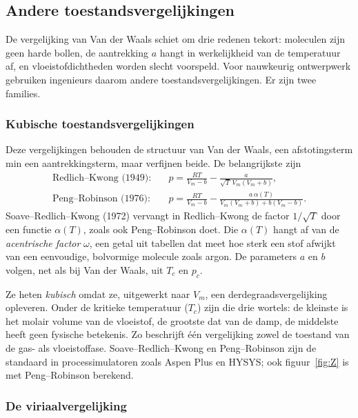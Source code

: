 \subsection{Andere toestandsvergelijkingen}
\label{sec:andere-toestandsvgl}

De vergelijking van Van der Waals schiet om drie redenen tekort: moleculen zijn geen harde bollen, de aantrekking $a$ hangt in werkelijkheid van de temperatuur af, en vloeistofdichtheden worden slecht voorspeld. Voor nauwkeurig ontwerpwerk gebruiken ingenieurs daarom andere toestandsvergelijkingen. Er zijn twee families.

\subsubsection{Kubische toestandsvergelijkingen}

Deze vergelijkingen behouden de structuur van Van der Waals, een afstotingsterm min een aantrekkingsterm, maar verfijnen beide. De belangrijkste zijn
\begin{align*}
\text{Redlich--Kwong (1949):}\quad & p = \frac{RT}{V_m - b} - \frac{a}{\sqrt{T}\,V_m(V_m + b)},\\
\text{Peng--Robinson (1976):}\quad & p = \frac{RT}{V_m - b} - \frac{a\,\alpha(T)}{V_m(V_m + b) + b(V_m - b)}.
\end{align*}
Soave--Redlich--Kwong (1972) vervangt in Redlich--Kwong de factor $1/\sqrt{T}$ door een functie $\alpha(T)$, zoals ook Peng--Robinson doet. Die $\alpha(T)$ hangt af van de \emph{acentrische factor} $\omega$, een getal uit tabellen dat meet hoe sterk een stof afwijkt van een eenvoudige, bolvormige molecule zoals argon. De parameters $a$ en $b$ volgen, net als bij Van der Waals, uit $T_c$ en $p_c$.

Ze heten \emph{kubisch} omdat ze, uitgewerkt naar $V_m$, een derdegraadsvergelijking opleveren. Onder de kritieke temperatuur ($T_c$) zijn die drie wortels: de kleinste is het molair volume van de vloeistof, de grootste dat van de damp, de middelste heeft geen fysische betekenis. Zo beschrijft \'e\'en vergelijking zowel de toestand van de gas- als vloeistoffase. Soave--Redlich--Kwong en Peng--Robinson zijn de standaard in processimulatoren zoals Aspen Plus en HYSYS; ook figuur~\ref{fig:Z} is met Peng--Robinson berekend.

\subsubsection{De viriaalvergelijking}

